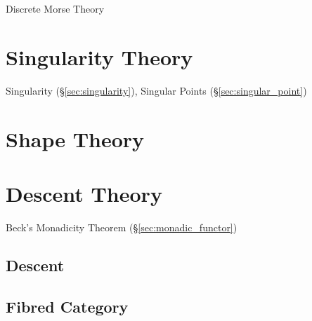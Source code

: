 Discrete Morse Theory



\section{Singularity Theory}\label{sec:singularity_theory}

\fist Singularity (\S\ref{sec:singularity}), Singular Points
(\S\ref{sec:singular_point})



\section{Shape Theory}\label{sec:shape_theory}

\section{Descent Theory}\label{sec:descent_theory}

Beck's Monadicity Theorem (\S\ref{sec:monadic_functor})



\subsection{Descent}\label{sec:descent}

\subsection{Fibred Category}\label{sec:fibred_category}



